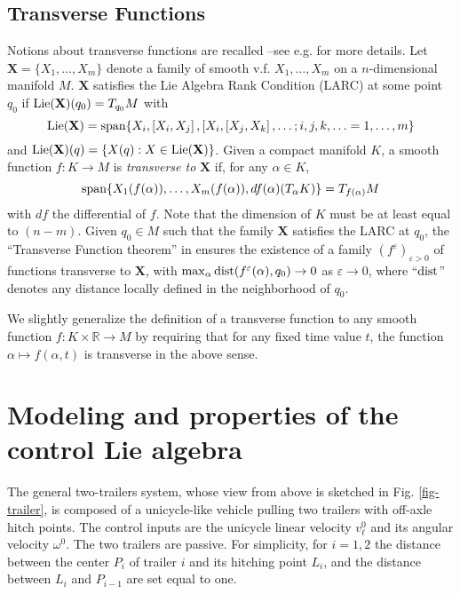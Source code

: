 \documentclass[a4paper,twoside]{article}
\def \RR {{\mathbb R}}
\def \eps {\varepsilon}
\def \span {\textnormal{span}}
\def \dist {\textnormal{dist}}
\def \bx {{\mathbf X}}
\newcommand{\tnm}[1]{\textnormal{#1}}
\begin{document}
\subsection{Transverse Functions}
\label{tf-subsec}
Notions about transverse functions are recalled --see e.g. \cite{ms03} for more details.
Let $\bx=\{X_1, \ldots, X_m\} $ denote a family of smooth v.f. $X_1, \ldots, X_m$ 
on a $n$-dimensional manifold $M$. $\bx$ satisfies the Lie Algebra Rank Condition (LARC) at some point $q_0$ if $\tnm{Lie}(\bx)(q_0)= T_{q_0} M$ with 
\[
\tnm{Lie}(\bx)=
\span \{X_i, [X_i,X_j] \, , [X_i, [X_j,X_k] \, , \ldots ; i,j,k, \ldots =1,\ldots,m \}
\]
and $\tnm{Lie}(\bx)(q) = \{ X(q) : X \in \tnm{Lie}(\bx) \}$. Given a compact manifold $K$,
a smooth function 
$f: K \longrightarrow M$ is {\em transverse to} $\bx$ if, for any $\alpha \in K$, 
\begin{equation}
\label{trans}
\tnm{span} \{X_1(f(\alpha)),  \ldots, X_m(f(\alpha)), df(\alpha)(T_{\alpha} K) \}
= T_{f(\alpha)} M
\end{equation}
with $df$ the differential of $f$.
Note that the dimension of $K$ must be at least equal to $(n-m)$. 
Given $q_0 \in M$ such that the family $\bx$ satisfies
the LARC at $q_0$, the ``Transverse Function theorem'' in \cite{ms01-siam} ensures the existence of  a family $(f^\eps)_{\eps>0}$ of functions transverse to $\bx$, with $\max_{\alpha} \dist(f^\eps(\alpha),q_0) \rightarrow 0$ as $\eps \rightarrow 0$, where ``$\dist$'' denotes any distance locally defined in the neighborhood of $q_0$. 

We slightly generalize the definition of a transverse function to any smooth function 
$f: K \times \RR \longrightarrow M$  by requiring that for any 
fixed time value $t$, the function $\alpha \longmapsto f(\alpha, t)$ is transverse in the above sense.

\section{Modeling and properties of the control Lie algebra}
\label{sec-model}
The general two-trailers system, whose view from above is sketched in Fig. \ref{fig-trailer}, is composed of a unicycle-like
vehicle pulling two trailers with off-axle hitch points. The control inputs are the unicycle linear 
velocity $v_\ell^0$ and its angular velocity $\omega^0$. The two
trailers are passive. For simplicity, for $i=1,2$ the distance between the 
center $P_i$ of trailer $i$ and its hitching point $L_i$, and the distance between $L_i$ and 
$P_{i-1}$ are set equal to one.
\end{document}
